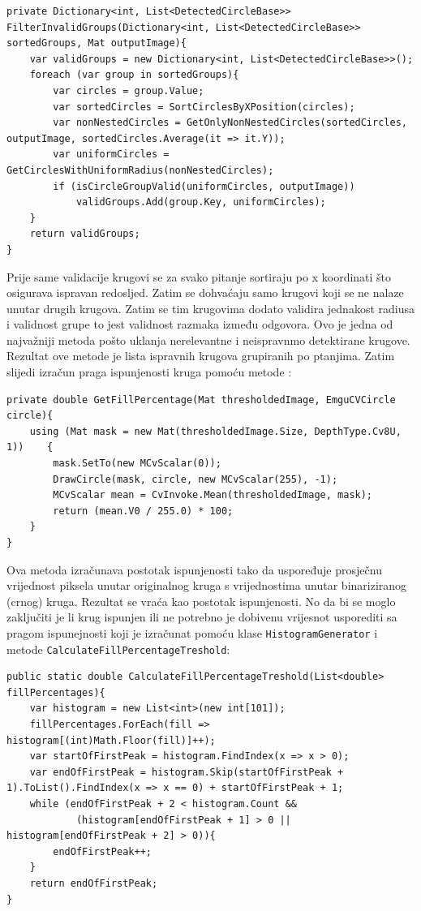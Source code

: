 \documentclass{foi}
\begin{document}
\begin{lstlisting}[caption={Metoda za filtriranje neispavnih krugova i pitanja}]
private Dictionary<int, List<DetectedCircleBase>> FilterInvalidGroups(Dictionary<int, List<DetectedCircleBase>> sortedGroups, Mat outputImage){
    var validGroups = new Dictionary<int, List<DetectedCircleBase>>();
    foreach (var group in sortedGroups){
        var circles = group.Value;
        var sortedCircles = SortCirclesByXPosition(circles);
        var nonNestedCircles = GetOnlyNonNestedCircles(sortedCircles, outputImage, sortedCircles.Average(it => it.Y));
        var uniformCircles = GetCirclesWithUniformRadius(nonNestedCircles);
        if (isCircleGroupValid(uniformCircles, outputImage))
            validGroups.Add(group.Key, uniformCircles);
    }
    return validGroups;
}
\end{lstlisting}

Prije same validacije krugovi se za svako pitanje sortiraju po x koordinati što osigurava ispravan redosljed. Zatim se dohvaćaju samo krugovi koji se ne nalaze unutar drugih krugova. Zatim se tim krugovima dodato validira jednakost radiusa i validnost grupe to jest validnost razmaka između odgovora. Ovo je jedna od najvažniji metoda pošto uklanja nerelevantne i neispravnmo detektirane krugove. Rezultat ove metode je lista ispravnih krugova grupiranih po ptanjima. Zatim slijedi izračun praga ispunjenosti kruga pomoću metode \texttt{}:


\begin{lstlisting}[caption={Metoda za izračun postotka ispunejnosti kruga}]
private double GetFillPercentage(Mat thresholdedImage, EmguCVCircle circle){
    using (Mat mask = new Mat(thresholdedImage.Size, DepthType.Cv8U, 1))    {
        mask.SetTo(new MCvScalar(0));
        DrawCircle(mask, circle, new MCvScalar(255), -1);
        MCvScalar mean = CvInvoke.Mean(thresholdedImage, mask);
        return (mean.V0 / 255.0) * 100;
    }
}
\end{lstlisting}

Ova metoda izračunava postotak ispunjenosti tako da uspoređuje prosječnu vrijednost piksela unutar originalnog kruga s vrijednostima unutar binariziranog (crnog) kruga. Rezultat se vraća kao postotak ispunjenosti.
\pagebreak
No da bi se moglo zaključiti je li krug ispunjen ili ne potrebno je dobivenu vrijesnot usporediti sa pragom ispunejnosti koji je izračunat pomoću klase \texttt{HistogramGenerator} i metode \texttt{CalculateFillPercentageTreshold}:

\begin{lstlisting}[caption={Metoda za filtriranje neispavnih krugova i pitanja}]
public static double CalculateFillPercentageTreshold(List<double> fillPercentages){
    var histogram = new List<int>(new int[101]);
    fillPercentages.ForEach(fill => histogram[(int)Math.Floor(fill)]++);
    var startOfFirstPeak = histogram.FindIndex(x => x > 0);
    var endOfFirstPeak = histogram.Skip(startOfFirstPeak + 1).ToList().FindIndex(x => x == 0) + startOfFirstPeak + 1;
    while (endOfFirstPeak + 2 < histogram.Count &&
            (histogram[endOfFirstPeak + 1] > 0 || histogram[endOfFirstPeak + 2] > 0)){
        endOfFirstPeak++;
    }
    return endOfFirstPeak;
}
\end{lstlisting}
\end{document}
